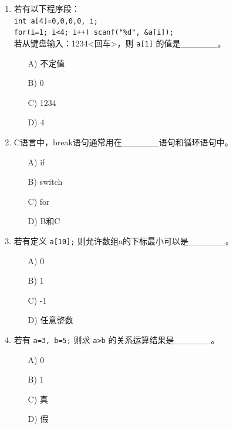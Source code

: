 \documentclass[a4paper,12pt]{article}
\begin{document}
\begin{enumerate}
	\item 若有以下程序段：\\
	      \texttt{int a[4]={0,0,0,0}, i;}\\
	      \texttt{for(i=1; i<4; i++) scanf("\%d", \&a[i]);}\\
	      若从键盘输入：1234<回车>，则 \texttt{a[1]} 的值是\_\_\_\_\_\_。
	      \begin{enumerate}
		      \item[A)] 不定值
		      \item[B)] 0
		      \item[C)] 1234
		      \item[D)] 4
	      \end{enumerate}
	      \vspace{0.3cm}

	\item C语言中，break语句通常用在\_\_\_\_\_\_语句和循环语句中。
	      \begin{enumerate}
		      \item[A)] if
		      \item[B)] switch
		      \item[C)] for
		      \item[D)] B和C
	      \end{enumerate}
	      \vspace{0.3cm}

	\item 若有定义 \texttt{a[10];} 则允许数组a的下标最小可以是\_\_\_\_\_\_。
	      \begin{enumerate}
		      \item[A)] 0
		      \item[B)] 1
		      \item[C)] -1
		      \item[D)] 任意整数
	      \end{enumerate}
	      \vspace{0.3cm}

	\item 若有 \texttt{a=3, b=5;} 则求 \texttt{a>b} 的关系运算结果是\_\_\_\_\_\_。
	      \begin{enumerate}
		      \item[A)] 0
		      \item[B)] 1
		      \item[C)] 真
		      \item[D)] 假
	      \end{enumerate}
	      \vspace{0.3cm}
\end{enumerate}
\end{document}
